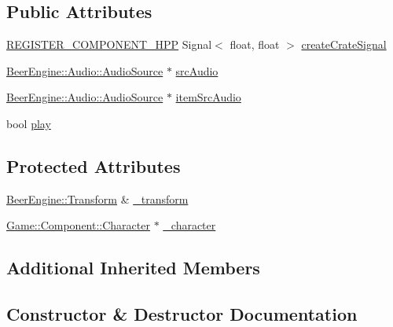 \subsection*{Public Attributes}
\begin{DoxyCompactItemize}
\item 
\mbox{\hyperlink{_core_8hpp_a895cfc16b36b6c309f80b98ded63df4f}{R\+E\+G\+I\+S\+T\+E\+R\+\_\+\+C\+O\+M\+P\+O\+N\+E\+N\+T\+\_\+\+H\+PP}} Signal$<$ float, float $>$ \mbox{\hyperlink{class_game_1_1_component_1_1_player_ad3682154e32e67518f715362f130e811}{create\+Crate\+Signal}}
\item 
\mbox{\hyperlink{class_beer_engine_1_1_audio_1_1_audio_source}{Beer\+Engine\+::\+Audio\+::\+Audio\+Source}} $\ast$ \mbox{\hyperlink{class_game_1_1_component_1_1_player_aa488f4fe911f9532edfb35f72b926f9e}{src\+Audio}}
\item 
\mbox{\hyperlink{class_beer_engine_1_1_audio_1_1_audio_source}{Beer\+Engine\+::\+Audio\+::\+Audio\+Source}} $\ast$ \mbox{\hyperlink{class_game_1_1_component_1_1_player_ac2b4bb08b1e40f6b0923fa44869a69b7}{item\+Src\+Audio}}
\item 
bool \mbox{\hyperlink{class_game_1_1_component_1_1_player_af1aa4677c3d843f722d502529dbe1192}{play}}
\end{DoxyCompactItemize}
\subsection*{Protected Attributes}
\begin{DoxyCompactItemize}
\item 
\mbox{\hyperlink{class_beer_engine_1_1_transform}{Beer\+Engine\+::\+Transform}} \& \mbox{\hyperlink{class_game_1_1_component_1_1_player_a26eea6165782d56022fff50a171036ea}{\+\_\+transform}}
\item 
\mbox{\hyperlink{class_game_1_1_component_1_1_character}{Game\+::\+Component\+::\+Character}} $\ast$ \mbox{\hyperlink{class_game_1_1_component_1_1_player_a7c5cf8b95048aff35154775f3bfd9a21}{\+\_\+character}}
\end{DoxyCompactItemize}
\subsection*{Additional Inherited Members}


\subsection{Constructor \& Destructor Documentation}
\mbox{\label{class_game_1_1_component_1_1_player_a3568c25cf29f9931ed2c07208c98ee30}} 
